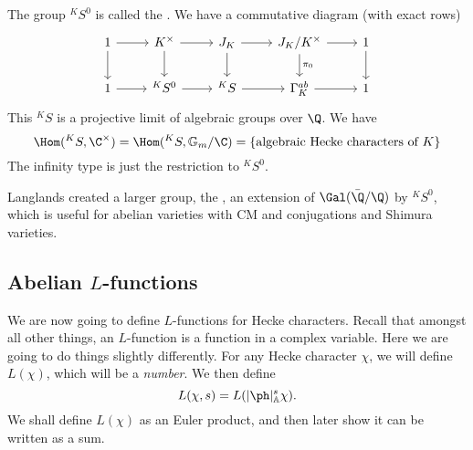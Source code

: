 \documentclass[a4paper]{article}
\renewcommand\G{\mathbb{G}}
\newcommand\A{\mathbb{A}}
\begin{document}
The group $^KS^0$ is called the . We have a commutative diagram (with exact rows)
\[
  \begin{tikzcd}
    1 \ar[r] \ar[d] & K^\times \ar[r] \ar[d] & J_K \ar[r] \ar[d] & J_K/K^\times \ar[d, "\pi_0"] \ar[r] & 1 \ar[d]\\
    1 \ar[r] & ^KS^0 \ar[r] & ^KS \ar[r] & \Gamma^{ab}_K \ar[r] & 1
  \end{tikzcd}
\]
This $^KS$ is a projective limit of algebraic groups over $\Q$. We have
\[
  \Hom(^KS, \C^\times) = \Hom(^KS, \G_m/\C) = \{\text{algebraic Hecke characters of $K$}\}
\]
The infinity type is just the restriction to $^KS^0$.

Langlands created a larger group, the , an extension of $\Gal(\bar{\Q}/\Q)$ by $^K S^0$, which is useful for abelian varieties with CM and conjugations and Shimura varieties.

\subsection{Abelian \texorpdfstring{$L$}{L}-functions}
We are now going to define $L$-functions for Hecke characters. Recall that amongst all other things, an $L$-function is a function in a complex variable. Here we are going to do things slightly differently. For any Hecke character $\chi$, we will define $L(\chi)$, which will be a \emph{number}. We then define
\[
  L(\chi, s) = L(|\ph|_\A^s \chi).
\]
We shall define $L(\chi)$ as an Euler product, and then later show it can be written as a sum.
\end{document}

